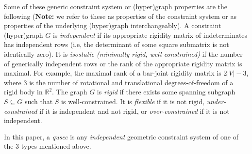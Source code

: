 Some of these generic constraint system or 
(hyper)graph properties are the following ({\bf Note:} we refer to these as
properties of the constraint system or as properties of the underlying
(hyper)graph interchangeably).
%
A constraint (hyper)graph $G$ is {\em independent} if its appropriate rigidity matrix of indeterminates  
has independent rows
(i.e, the determinant of some square submatrix is not
identically zero). 
It is {\em isostatic (minimally rigid, well-constrained)} 
if the number of generically independent rows or the rank of the appropriate rigidity matrix is maximal.
For example, the maximal rank of a bar-joint rigidity matrix is $2|V| - 3$, 
where $3$ is the number of rotational and translational degrees-of-freedom of a rigid body in $\mathbb{R}^2$.
The graph $G$ is {\em rigid} if there exists some spanning subgraph $S\subseteq G$ such that $S$ is well-constrained. 
It is {\em flexible} if it is not rigid, {\em under-constrained} if it is independent and not rigid, or {\em over-constrained} if it is not independent.


In this paper, 
a {\em qusec} is any {\em independent} geometric 
constraint system of one of the 3
types mentioned above.






